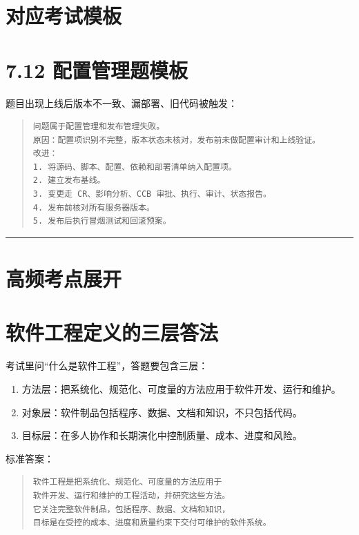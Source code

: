 \documentclass[UTF8,zihao=-4]{ctexart}
\begin{document}
\section{对应考试模板}

\section{7.12 配置管理题模板}

题目出现上线后版本不一致、漏部署、旧代码被触发：

\begin{quote}
\footnotesize
\begin{verbatim}
问题属于配置管理和发布管理失败。
原因：配置项识别不完整，版本状态未核对，发布前未做配置审计和上线验证。
改进：
1. 将源码、脚本、配置、依赖和部署清单纳入配置项。
2. 建立发布基线。
3. 变更走 CR、影响分析、CCB 审批、执行、审计、状态报告。
4. 发布前核对所有服务器版本。
5. 发布后执行冒烟测试和回滚预案。
\end{verbatim}
\end{quote}

\bigskip\hrule\bigskip

\section{高频考点展开}

\section{软件工程定义的三层答法}

考试里问“什么是软件工程”，答题要包含三层：

\begin{enumerate}
\item 方法层：把系统化、规范化、可度量的方法应用于软件开发、运行和维护。
\item 对象层：软件制品包括程序、数据、文档和知识，不只包括代码。
\item 目标层：在多人协作和长期演化中控制质量、成本、进度和风险。
\end{enumerate}

标准答案：

\begin{quote}
\footnotesize
\begin{verbatim}
软件工程是把系统化、规范化、可度量的方法应用于
软件开发、运行和维护的工程活动，并研究这些方法。
它关注完整软件制品，包括程序、数据、文档和知识，
目标是在受控的成本、进度和质量约束下交付可维护的软件系统。
\end{verbatim}
\end{quote}
\end{document}
